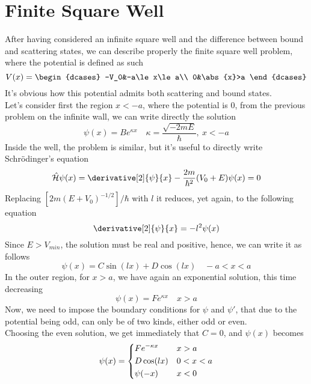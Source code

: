 \documentclass[a4paper, 11pt]{book}
\newcommand{\1}{\opr{\mathds{1}}}
\newcommand{\ham}{\mathcal{H}}
\newcommand{\opr}[1]{\hat{#1}}
\theoremstyle{plain}
\begin{document}
	\section{Finite Square Well}
	After having considered an infinite square well and the difference between bound and scattering states, we can describe properly the finite square well problem, where the potential is defined as such
	\begin{equation*}
		V(x)=\begin{dcases}
			-V_0&-a\le x\le a\\
			0&\abs{x}>a
		\end{dcases}
	\end{equation*}
	It's obvious how this potential admits both scattering and bound states.\\
	Let's consider first the region $x<-a$, where the potential is $0$, from the previous problem on the infinite wall, we can write directly the solution
	\begin{equation}
		\psi(x)=Be^{\kappa x}\quad \kappa=\frac{\sqrt{-2mE}}{\hbar},\ x<-a
		\label{eq:solution1nega}
	\end{equation}
	Inside the well, the problem is similar, but it's useful to directly write Schrödinger's equation
	\begin{equation}
		\opr{\ham}\psi(x)=\derivative[2]{\psi}{x}-\frac{2m}{\hbar^2}(V_0+E)\psi(x)=0
		\label{eq:insidewellschr}
	\end{equation}
	Replacing $[2m(E+V_0)^{-1/2}]/\hbar$ with $l$ it reduces, yet again, to the following equation
	\begin{equation*}
		\derivative[2]{\psi}{x}=-l^2\psi(x)
	\end{equation*}
	Since $E>V_{min}$, the solution must be real and positive, hence, we can write it as follows
	\begin{equation}
		\psi(x)=C\sin(lx)+D\cos(lx)\quad -a<x<a
		\label{eq:insidewellsolution}
	\end{equation}
	In the outer region, for $x>a$, we have again an exponential solution, this time decreasing
	\begin{equation}
		\psi(x)=Fe^{\kappa x}\quad x>a
		\label{eq:solution2pos}
	\end{equation}
	Now, we need to impose the boundary conditions for $\psi$ and $\psi'$, that due to the potential being odd, can only be of two kinds, either odd or even.\\
	Choosing the even solution, we get immediately that $C=0$, and $\psi(x)$ becomes
	\begin{equation}
		\psi(x)=\begin{dcases}
			Fe^{-\kappa x}&x>a\\
			D\cos(lx)&0<x<a\\
			\psi(-x)&x<0
		\end{dcases}
		\label{eq:almostfinalpsisquarewell}
	\end{equation}
\end{document}
